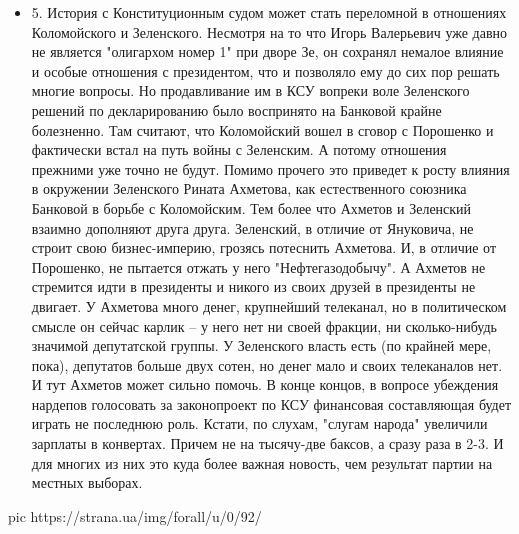 \begin{itemize}
\item 5. История с Конституционным судом может стать переломной в отношениях
				Коломойского и Зеленского. Несмотря на то что Игорь Валерьевич уже
				давно не является "олигархом номер 1" при дворе Зе, он сохранял немалое
				влияние и особые отношения с президентом, что и позволяло ему до сих
				пор решать многие вопросы.  Но продавливание им в КСУ вопреки воле
				Зеленского решений по декларированию было воспринято на Банковой крайне
				болезненно. Там считают, что Коломойский вошел в сговор с Порошенко и
				фактически встал на путь войны с Зеленским. А потому отношения прежними
				уже точно не будут. Помимо прочего это приведет к росту влияния в
				окружении Зеленского Рината Ахметова, как естественного союзника
				Банковой в борьбе с Коломойским. Тем более что Ахметов и Зеленский
				взаимно дополняют друга друга. Зеленский, в отличие от Януковича, не
				строит свою бизнес-империю, грозясь потеснить Ахметова. И, в отличие от
				Порошенко, не пытается отжать у него "Нефтегазодобычу". А Ахметов не
				стремится идти в президенты и никого из своих друзей в президенты не
				двигает. У Ахметова много денег, крупнейший телеканал, но в
				политическом смысле он сейчас карлик – у него нет ни своей фракции, ни
				сколько-нибудь значимой депутатской группы. У Зеленского власть есть
				(по крайней мере, пока), депутатов больше двух сотен, но денег мало и
				своих телеканалов нет. И тут Ахметов может сильно помочь. В конце
				концов, в вопросе убеждения нардепов голосовать за законопроект по КСУ
				финансовая составляющая будет играть не последнюю роль. Кстати, по
				слухам, "слугам народа" увеличили зарплаты в конвертах. Причем не на
				тысячу-две баксов, а сразу раза в 2-3. И для многих из них это куда
				более важная новость, чем результат партии на местных выборах.
\end{itemize}

\ifcmt
pic https://strana.ua/img/forall/u/0/92/%
\fi

